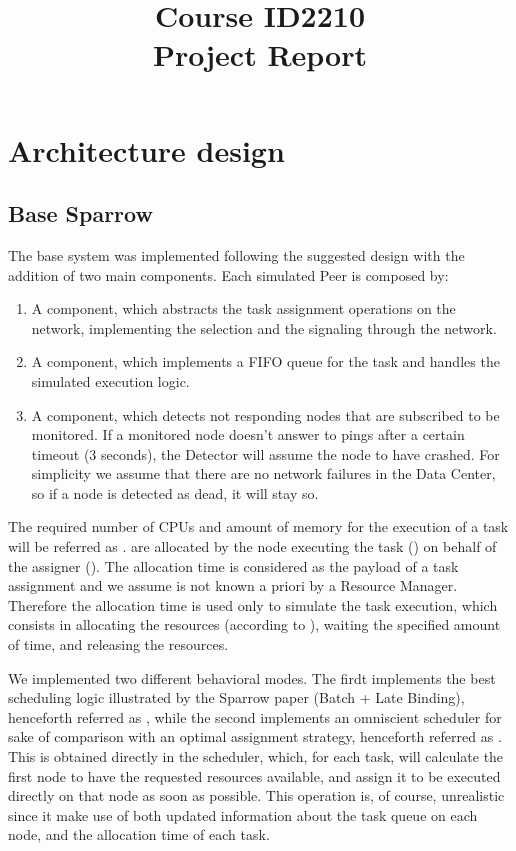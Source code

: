 \documentclass[conference]{IEEEtran}
\title{
  Course ID2210\\
  Project Report
}
\author{
  \IEEEauthorblockN{Riccardo Reale}
  \IEEEauthorblockA{Peerialism AB\\
    {riccardo.reale@peerialism.com}\\
    \url{https://github.com/riccardoreale/id2210-vt14.git}
  }
  \and
  \IEEEauthorblockN{Giovanni Simoni}
  \IEEEauthorblockA{Peerialism AB\\
    {giovanni.simoni@peerialism.com}\\
    \url{https://github.com/dacav/id2210-vt14.git}
  }
}
\begin{document}
\maketitle

\section{Architecture design}

  \subsection{Base Sparrow}

  The base system was implemented following the suggested design with the
  addition of two main components. Each simulated Peer is composed by:
  \begin{enumerate}

  \item A \ResourceManager component, which abstracts the task assignment
    operations on the network, implementing the selection and the
    signaling through the network.

  \item A \RmWorker component, which implements a FIFO queue for the task and
    handles the simulated execution logic.

  \item A  component, which detects not
    responding nodes that are subscribed to be monitored. If a monitored
    node doesn't answer to pings after a certain timeout (3 seconds),
    the Detector will assume the node to have crashed. For simplicity we
    assume that there are no network failures in the Data Center, so if a
    node is detected as dead, it will stay so.

  \end{enumerate}

  The required number of CPUs and amount of memory for the execution of a
  task will be referred as \treq. \Treq are allocated by the node
  executing the task (\exc) on behalf of the assigner (\tmast). The
  allocation time is considered as the payload of a task assignment and
  we assume is not known a priori by a Resource Manager. Therefore the
  allocation time is used only to simulate the task execution, which
  consists in allocating the resources (according to \treq), waiting the
  specified amount of time, and releasing the resources.

  We implemented two different behavioral modes. The firdt implements the
  best scheduling logic illustrated by the Sparrow paper (Batch + Late
  Binding), henceforth referred as \us, while the second implements an
  omniscient scheduler for sake of comparison with an optimal assignment
  strategy, henceforth referred as \omni. This is obtained directly in the
  \dc scheduler, which, for each task, will calculate the first
  node to have the requested resources available, and assign it to be
  executed directly on that node as soon as possible. This operation is,
  of course, unrealistic since it make use of both updated information
  about the task queue on each node, and the allocation time of each task.
\end{document}

